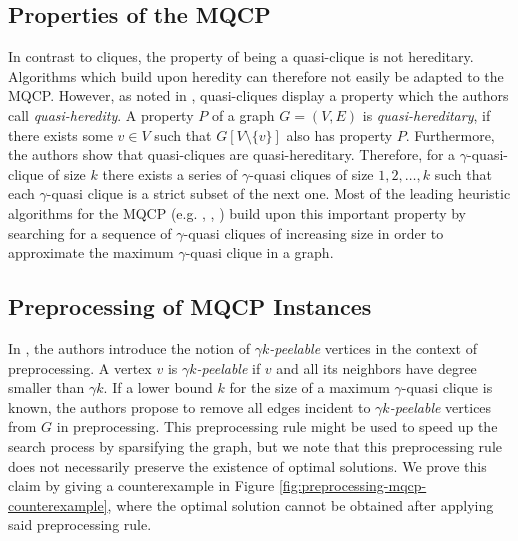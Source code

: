 \documentclass[draft,final]{vutinfth} %
\begin{document}
\subsection{Properties of the MQCP}
In contrast to cliques, the property of being a quasi-clique is not hereditary. Algorithms which build upon heredity can therefore not easily be adapted to the MQCP. However, as noted in \cite{pattillo_maximum_2013}, quasi-cliques display a property which the authors call \textit{quasi-heredity}. A property $P$ of a graph $G = (V, E)$ is \textit{quasi-hereditary}, if there exists some $v \in V$ such that $G[V \setminus \{v\}]$ also has property $P$. Furthermore, the authors show that quasi-cliques are quasi-hereditary. Therefore, for a $\gamma$-quasi-clique of size $k$ there exists a series of $\gamma$-quasi cliques of size $1,2, \dots, k$ such that each $\gamma$-quasi clique is a strict subset of the next one. Most of the leading heuristic algorithms for the MQCP (e.g. \cite{djeddi_extension_2019}, \cite{zhou_opposition-based_2020}, \cite{chen_nuqclq_2021}) build upon this important property by searching for a sequence of $\gamma$-quasi cliques of increasing size in order to approximate the maximum $\gamma$-quasi clique in a graph. 

\subsection{Preprocessing of MQCP Instances}

In \cite{Abello2002}, the authors introduce the notion of $\gamma k$\emph{-peelable} vertices in the context of preprocessing. A vertex $v$ is $\gamma k$\emph{-peelable} if $v$ and all its neighbors have degree smaller than $\gamma k$. If a lower bound $k$ for the size of a maximum $\gamma$-quasi clique is known, the authors propose to remove all edges incident to $\gamma k$\emph{-peelable} vertices from $G$ in preprocessing. This preprocessing rule might be used to speed up the search process by sparsifying the graph, but we note that this preprocessing rule does not necessarily preserve the existence of optimal solutions. We prove this claim by giving a counterexample in Figure \ref{fig:preprocessing-mqcp-counterexample}, where the optimal solution cannot be obtained after applying said preprocessing rule. 
\end{document}
